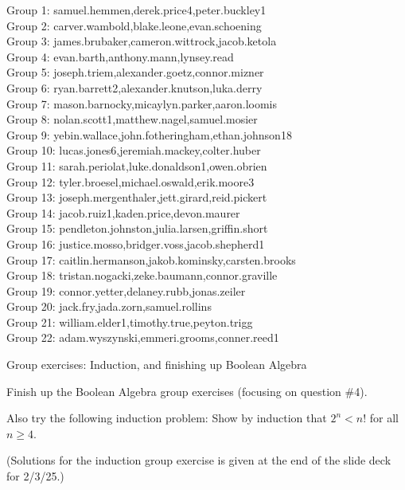 \documentclass[10pt]{beamer}
\begin{document}
\begin{frame}
\footnotesize
Group 1: samuel.hemmen,derek.price4,peter.buckley1\\
Group 2: carver.wambold,blake.leone,evan.schoening\\
Group 3: james.brubaker,cameron.wittrock,jacob.ketola\\
Group 4: evan.barth,anthony.mann,lynsey.read\\
Group 5: joseph.triem,alexander.goetz,connor.mizner\\
Group 6: ryan.barrett2,alexander.knutson,luka.derry\\
Group 7: mason.barnocky,micaylyn.parker,aaron.loomis\\
Group 8: nolan.scott1,matthew.nagel,samuel.mosier\\
Group 9: yebin.wallace,john.fotheringham,ethan.johnson18\\
Group 10: lucas.jones6,jeremiah.mackey,colter.huber\\
Group 11: sarah.periolat,luke.donaldson1,owen.obrien\\
Group 12: tyler.broesel,michael.oswald,erik.moore3\\
Group 13: joseph.mergenthaler,jett.girard,reid.pickert\\
Group 14: jacob.ruiz1,kaden.price,devon.maurer\\
Group 15: pendleton.johnston,julia.larsen,griffin.short\\
Group 16: justice.mosso,bridger.voss,jacob.shepherd1\\
Group 17: caitlin.hermanson,jakob.kominsky,carsten.brooks\\
Group 18: tristan.nogacki,zeke.baumann,connor.graville\\
Group 19: connor.yetter,delaney.rubb,jonas.zeiler\\
Group 20: jack.fry,jada.zorn,samuel.rollins\\
Group 21: william.elder1,timothy.true,peyton.trigg\\
Group 22: adam.wyszynski,emmeri.grooms,conner.reed1
\end{frame}


\begin{frame}{Group exercises: Induction, and finishing up Boolean Algebra}
\footnotesize 

Finish up the Boolean Algebra group exercises (focusing on question \#4).

\vfill 

Also try the following induction problem: Show by induction that $2^n < n!$ for all $n \geq 4$.

\vfill

(Solutions for the induction group exercise is given at the end of the slide deck for 2/3/25.)
\end{frame}
\end{document}
